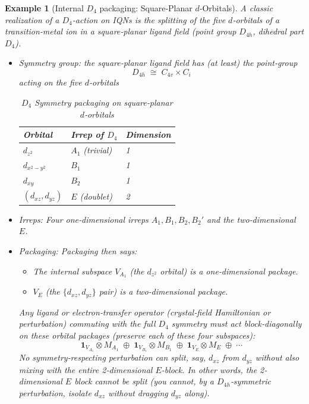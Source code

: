 \documentclass[12pt,a4paper]{article}
\newtheorem{example}{Example}
\begin{document}
\begin{example}[Internal $D_4$ packaging: Square‑Planar $d$‑Orbitals]
	A classic realization of a $D_4$-action on IQNs is the splitting of the five $d$‑orbitals of a transition‐metal ion in a square‑planar ligand field (point group $D_{4h}$, dihedral part $D_4$).
	\begin{itemize}
		\item Symmetry group:
		the square‐planar ligand field has (at least) the point‐group
		$$
		D_{4h}\;\cong\;C_{4v}\times C_i
		$$
		acting on the five $d$‐orbitals
		\begin{table}[h]
			\centering
			\caption{$D_4$ Symmetry packaging on square‑planar $d$‑orbitals}
			\begin{tabular}[hbt!]{|p{3cm}|p{3cm}|p{3cm}|}
				\hline\hline
				Orbital           & Irrep of $D_4$  & Dimension \\
				\hline
				$d_{z^2}$         & $A_1$ (trivial) & 1         \\
				$d_{x^2-y^2}$     & $B_1$           & 1         \\
				$d_{xy}$          & $B_2$           & 1         \\
				$(d_{xz},d_{yz})$ & $E$ (doublet)   & 2         \\
				\hline
			\end{tabular}
		\end{table}
		
		\item Irreps:
		Four one‑dimensional irreps $A_1,B_1,B_2,B_2'$ and the two‑dimensional $E$.
		
		\item Packaging:
		Packaging then says:
		\begin{itemize}
			\item The internal subspace $V_{A_1}$ (the $d_{z^2}$ orbital) is a one‑dimensional package.
			
			\item $V_E$ (the $\{d_{xz},d_{yz}\}$ pair) is a two‑dimensional package.
		\end{itemize}
		Any ligand or electron‐transfer operator (crystal‐field Hamiltonian or perturbation) commuting with the full $D_4$ symmetry must act block‑diagonally on these orbital packages (preserve each of these four subspaces):	
		$$
		\mathbf1_{V_{A_1}}\otimes M_{A_1}
		\;\oplus\;
		\mathbf1_{V_{B_1}}\otimes M_{B_1}
		\;\oplus\;
		\mathbf1_{V_{E}}\otimes M_{E}
		\;\oplus\;\cdots
		$$
		No symmetry‐respecting perturbation can split, say, $d_{xz}$ from $d_{yz}$ without also mixing with the entire 2‑dimensional $E$-block.
		In other words, the 2‐dimensional $E$ block cannot be split (you cannot, by a $D_{4h}$‐symmetric perturbation, isolate $d_{xz}$ without dragging $d_{yz}$ along).
	\end{itemize}	
\end{example}
\end{document}
